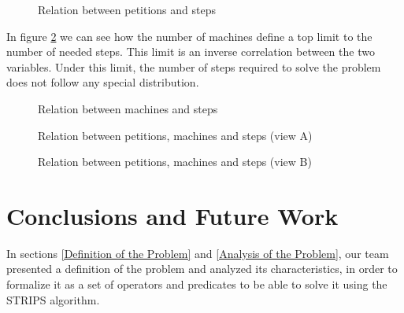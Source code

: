 \documentclass[12pt,a4paper,oneside]{article}
\numberwithin{equation}{section}
\numberwithin{equation}{section}
\theoremstyle{definition}
\begin{document}
\begin{figure}[h!]
	\centering
	\caption{Relation between petitions and steps}
	\label{fig:2d-petitions}
\end{figure}

In figure \ref{fig:2d-machines} we can see how the number of machines define a top limit to the number of needed steps. This limit is an inverse correlation between the two variables. Under this limit, the number of steps required to solve the problem does not follow any special distribution.

\begin{figure}[h!]
	\centering
	\caption{Relation between machines and steps}
	\label{fig:2d-machines}
\end{figure}

\newcommand{\plotthreedee}[2]{
	\begin{axis}[
		view={#2}{#1},
		xlabel=Petitions,
		ylabel=Machines,
		zlabel=Steps,
	]
	\addplot3[
		scatter,
		only marks,
	]
	table[
		x=Petitions,
		y=Machines,
		z=Steps,
		col sep=comma,
	]{results.csv};
	\end{axis}
}

\clearpage

\begin{figure}
	\centering
	\caption{Relation between petitions, machines and steps (view A)}
	\label{fig:3d-a}
\end{figure}

\begin{figure}
	\centering
	\caption{Relation between petitions, machines and steps (view B)}
	\label{fig:3d-b}
\end{figure}

\clearpage

\section{Conclusions and Future Work} \label{Conclusions}

In sections \ref{Definition of the Problem} and \ref{Analysis of the Problem}, our team presented a definition of the problem and analyzed its characteristics, in order to formalize it as a set of operators and predicates to be able to solve it using the STRIPS algorithm.
\end{document}
